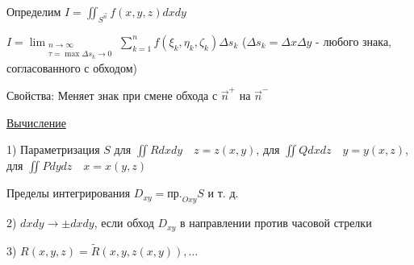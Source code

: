 \documentclass[12pt]{article}
\begin{document}

    Определим $\displaystyle I = \iint_{S^{\overrightarrow{n}}} f(x, y, z) dxdy$

    $\displaystyle I = \lim_{\substack{n \to \infty \\ \tau = \max \Delta s_k \to 0}} \sum_{k=1}^n f(\xi_k, \eta_k, \zeta_k) \Delta s_k$ ($\displaystyle \Delta s_k = \Delta x\Delta y$ - любого знака, согласованного с обходом)

    Свойства: Меняет знак при смене обхода с $\displaystyle \overrightarrow{n}^+$ на $\displaystyle \overrightarrow{n}^-$

    \underline{Вычисление}

    1) Параметризация $S$ \quad для $\displaystyle \iint Rdxdy \quad z = z(x, y)$, для $\displaystyle \iint Qdxdz \quad y = y(x, z)$, для $\displaystyle \iint Pdydz \quad x = x(y, z)$

    Пределы интегрирования $\displaystyle D_{xy} = \text{пр.}_{Oxy} S$ и т. д.

    2) $dxdy \to \pm dxdy$, если обход $\displaystyle D_{xy}$ в направлении против часовой стрелки

    3) $R(x, y, z) = \tilde{R}(x, y, z(x, y)), \dots$
\end{document}
